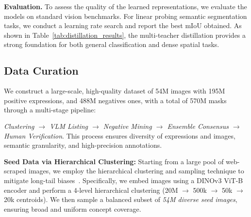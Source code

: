 \noindent \textbf{Evaluation.} To assess the quality of the learned representations, we evaluate the models on standard vision benchmarks. For linear probing semantic segmentation tasks, we conduct a learning rate search and report the best mIoU obtained. As shown in Table~\ref{tab:distillation_results}, the multi-teacher distillation provides a strong foundation for both general classification and dense spatial tasks.

\begin{table}[t]
\centering
\caption{Performance of the two dense models initialized via multi-teacher distillation. All evaluations are run at $512\times512$ maximum number of pixels.\vspace{-0.2cm}}
\setlength{\tabcolsep}{6pt}
\label{tab:distillation_results}
\end{table}




\subsection{Data Curation}

\noindent We construct a large-scale, high-quality dataset of 54M images with 195M positive expressions, and 488M negatives ones, with a total of 570M masks through a multi-stage pipeline: 

\noindent \textit{Clustering $\to$ VLM Listing $\to$ Negative Mining $\to$ Ensemble Consensus $\to$ Human Verification}. This process ensures diversity of expressions and images, semantic granularity, and high-precision annotations.

\noindent \textbf{Seed Data via Hierarchical Clustering:}
Starting from a large pool of web-scraped images, we employ the hierarchical clustering and sampling technique to mitigate long-tail biases~\citep{vo2024automatic}. Specifically, we embed images using a DINOv3 ViT-B encoder and perform a 4-level hierarchical clustering (20M $\to$ 500k $\to$ 50k $\to$ 20k centroids). We then sample a balanced subset of \textit{54M diverse seed images}, ensuring broad and uniform concept coverage.

